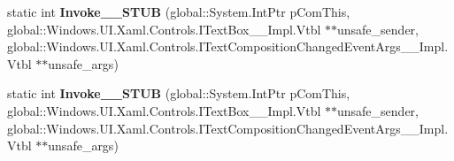 \begin{DoxyCompactItemize}
\mbox{\label{struct_windows_1_1_foundation_1_1_typed_event_handler___a___windows___u_i___xaml___controls___te0b038d62b9928b8ea6f0314c4279430d_acd364c41f24b7e657cbc2aba08afcb51}} 
static int {\bfseries Invoke\+\_\+\+\_\+\+S\+T\+UB} (global\+::\+System.\+Int\+Ptr p\+Com\+This, global\+::\+Windows.\+U\+I.\+Xaml.\+Controls.\+I\+Text\+Box\+\_\+\+\_\+\+Impl.\+Vtbl $\ast$$\ast$unsafe\+\_\+sender, global\+::\+Windows.\+U\+I.\+Xaml.\+Controls.\+I\+Text\+Composition\+Changed\+Event\+Args\+\_\+\+\_\+\+Impl.\+Vtbl $\ast$$\ast$unsafe\+\_\+args)
\item 
\mbox{\label{struct_windows_1_1_foundation_1_1_typed_event_handler___a___windows___u_i___xaml___controls___te0b038d62b9928b8ea6f0314c4279430d_acd364c41f24b7e657cbc2aba08afcb51}} 
static int {\bfseries Invoke\+\_\+\+\_\+\+S\+T\+UB} (global\+::\+System.\+Int\+Ptr p\+Com\+This, global\+::\+Windows.\+U\+I.\+Xaml.\+Controls.\+I\+Text\+Box\+\_\+\+\_\+\+Impl.\+Vtbl $\ast$$\ast$unsafe\+\_\+sender, global\+::\+Windows.\+U\+I.\+Xaml.\+Controls.\+I\+Text\+Composition\+Changed\+Event\+Args\+\_\+\+\_\+\+Impl.\+Vtbl $\ast$$\ast$unsafe\+\_\+args)
\end{DoxyCompactItemize}
